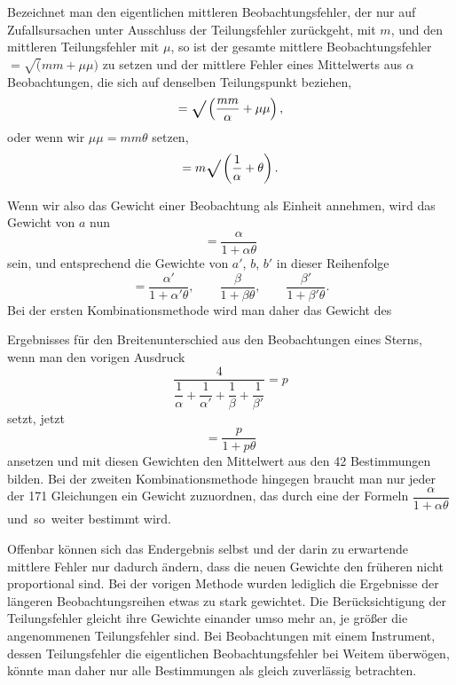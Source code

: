 Bezeichnet man den eigentlichen mittleren Beobachtungsfehler, der nur
auf Zufallsursachen unter Ausschluss der Teilungsfehler zurückgeht, mit \(m\),
und den mittleren Teilungsfehler mit \(\mu\), so ist der gesamte mittlere
Beobachtungsfehler \(=\surd(mm+\mu\mu)\) zu setzen und der mittlere Fehler eines
Mittelwerts aus \(\alpha\) Beobachtungen, die sich auf denselben Teilungspunkt beziehen,
\[
=\ixrad\left(\frac{mm}{\alpha}+\mu\mu\right),
\]
\noindent oder wenn wir \(\mu\mu=mm\theta\) setzen,
\[
=m\ixrad\left(\frac1\alpha+\theta\right).
\]

Wenn wir also das Gewicht einer Beobachtung 
als Einheit annehmen, wird das Gewicht von \(a\) nun
\[
=\frac{\alpha}{1+\alpha\theta}
\]
\noindent sein, und entsprechend die Gewichte von \(a'\), \(b\), \(b'\) in dieser Reihenfolge
\[
=\frac{\alpha'}{1+\alpha'\theta},\qquad
\frac{\beta}{1+\beta\theta},\qquad
\frac{\beta'}{1+\beta'\theta}.
\]
Bei der ersten Kombinationsmethode wird man daher das Gewicht des
\par

\par\clearpage
\noindent\makebox[12mm][l]{}\par\medskip

\noindent Ergebnisses für den Breitenunterschied aus den Beobachtungen eines Sterns,
wenn man den vorigen Ausdruck
\[
\frac4{\dfrac1\alpha+\dfrac1{\alpha'}+\dfrac1\beta+\dfrac1{\beta'}}=p
\]
\noindent setzt, jetzt
\[
=\frac p{1+p\theta}
\]
\noindent ansetzen und mit diesen Gewichten den Mittelwert aus den 42 Bestimmungen
bilden. Bei der zweiten Kombinationsmethode hingegen braucht man nur
jeder der 171 Gleichungen ein Gewicht zuzuordnen, das durch eine der
Formeln \(\dfrac{\alpha}{1+\alpha\theta}\) und\ so\ weiter bestimmt wird.

Offenbar können sich das Endergebnis selbst und der darin zu erwartende
mittlere Fehler nur dadurch ändern, dass die neuen Gewichte den früheren
nicht proportional sind. Bei der vorigen Methode wurden lediglich die
Ergebnisse der längeren Beobachtungsreihen etwas zu stark gewichtet. Die
Berücksichtigung der Teilungsfehler gleicht ihre Gewichte einander umso
mehr an, je größer die angenommenen Teilungsfehler sind. Bei Beobachtungen
mit einem Instrument, dessen Teilungsfehler
die eigentlichen Beobachtungsfehler bei Weitem überwögen,
könnte man daher nur alle Bestimmungen als gleich
zuverlässig betrachten.

